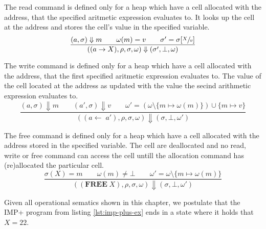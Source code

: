 The read command is defined only for a heap which have a cell allocated with the address, that the specified aritmetic expression evaluates to. It looks up the cell at the address and stores the cell's value in the specified variable.
\begin{equation}
\frac
{(a,\sigma) \Downarrow m \qquad \omega(m)=v \qquad \sigma'=\sigma[\sfrac{X}{v}]}
{((a \rightarrow X), \rho, \sigma, \omega) \Downarrow (\sigma', \bot, \omega)}
\end{equation}

The write command is defined only for a heap which have a cell allocated with the address, that the first specified aritmetic expression evaluates to. The value of the cell located at the address as updated with the value the secind arithmetic expression evaluates to.
\begin{equation}
\frac
{(a,\sigma)\Downarrow m \qquad (a',\sigma)\Downarrow v \qquad \omega'=(\omega\setminus\{m\mapsto\omega(m)\})\cup\{m\mapsto v\}}
{((a\leftarrow\;a'), \rho, \sigma, \omega) \Downarrow (\sigma, \bot, \omega')}
\end{equation}

The free command is defined only for a heap which have a cell allocated with the address stored in the specified variable. The cell are deallocated and no read, write or free command can access the cell untill the allocation command has (re)allocated the particular cell.
\begin{equation}
\frac
{\sigma(X)=m \qquad \omega(m)\neq\bot \qquad \omega'=\omega\setminus\{m\mapsto\omega(m)\}}
{((\textbf{FREE}\;X), \rho, \sigma, \omega) \Downarrow (\sigma, \bot, \omega')}
\end{equation}

\begin{prop}\label{prop:program-correct}
Given all operational sematics shown in this chapter, we postulate that the IMP+ program from listing \ref{lst:imp-plus-ex} ends in a state where it holds that $X = 22$.
\end{prop}